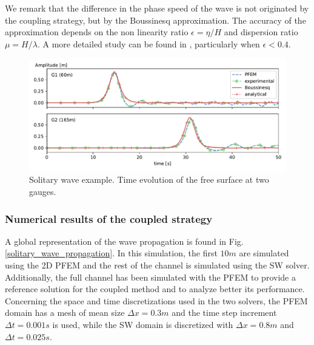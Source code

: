 We remark that the difference in the phase speed of the wave is not originated by the coupling strategy, but by the Boussinesq approximation. The accuracy of the approximation depends on the non linearity ratio $\epsilon = \eta/H$ and dispersion ratio $\mu = H / \lambda$. A more detailed study can be found in \cite{wu2018}, particularly when $\epsilon<0.4$.


\begin{figure} [htb]
    \centering
    \includegraphics[width=\textwidth]{img/coupling/solitary_wave.pdf}
    \caption{Solitary wave example. Time evolution of the free surface at two gauges.}
    \label{solitary_wave}
\end{figure}



\subsubsection{Numerical results of the coupled strategy}

A global representation of the wave propagation is found in Fig. \ref{solitary_wave_propagation}. In this simulation, the first $10m$ are simulated using the 2D PFEM and the rest of the channel is simulated using the SW solver. Additionally, the full channel has been simulated with the PFEM to provide a reference solution for the coupled method and to analyze better its performance. Concerning the space and time discretizations used in the two solvers, the PFEM domain has a mesh of mean size $\Delta x=0.3m$ and the time step increment $\Delta t=0.001s$ is used, while the SW domain is discretized with $\Delta x=0.8m$ and $\Delta t=0.025s$.

